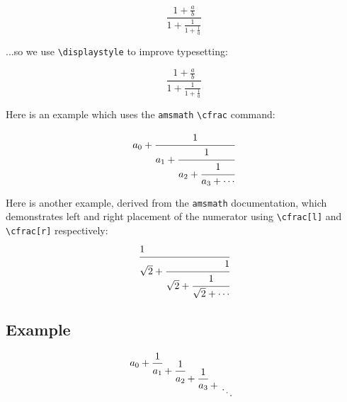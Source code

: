 \documentclass{article}
\begin{document}
\[ \frac{1+\frac{a}{b}}{1+\frac{1}{1+\frac{1}{a}}} \]

\noindent ...so we use \verb|\displaystyle| to improve typesetting:

\[ \frac{1+\frac{a}{b}} {\displaystyle 1+\frac{1}{1+\frac{1}{a}}} \]

Here is an example which uses the \texttt{amsmath} \verb|\cfrac| command:

\[
a_0+\cfrac{1}{a_1+\cfrac{1}{a_2+\cfrac{1}{a_3+\cdots}}}
\]

Here is another example, derived from the \texttt{amsmath} documentation, which demonstrates left
and right placement of the numerator using \verb|\cfrac[l]| and \verb|\cfrac[r]| respectively:
\[
\cfrac[l]{1}{\sqrt{2}+
	\cfrac[r]{1}{\sqrt{2}+
		\cfrac{1}{\sqrt{2}+\dotsb}}}
\]
\subsection*{Example}
\newcommand*{\contfrac}[2]{%
	{
		\rlap{$\dfrac{1}{\phantom{#1}}$}%
		\genfrac{}{}{0pt}{0}{}{#1+#2}%
	}
}
\[
a_0 +
\contfrac{a_1}{
	\contfrac{a_2}{
		\contfrac{a_3}{
			\genfrac{}{}{0pt}{0}{}{\ddots}
}}}
\]
\end{document}

